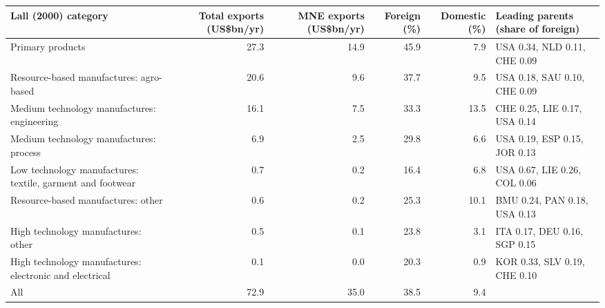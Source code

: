 \begin{tabular}{@{}l r r r r l@{}}
\toprule
Lall (2000) category & Total exports (US\$bn/yr) & MNE exports (US\$bn/yr) & Foreign (\%) & Domestic (\%) & Leading parents (share of foreign) \\
\midrule
Primary products & 27.3 & 14.9 & 45.9 & 7.9 & USA 0.34, NLD 0.11, CHE 0.09 \\
Resource-based manufactures: agro-based & 20.6 & 9.6 & 37.7 & 9.5 & USA 0.18, SAU 0.10, CHE 0.09 \\
Medium technology manufactures: engineering & 16.1 & 7.5 & 33.3 & 13.5 & CHE 0.25, LIE 0.17, USA 0.14 \\
Medium technology manufactures: process & 6.9 & 2.5 & 29.8 & 6.6 & USA 0.19, ESP 0.15, JOR 0.13 \\
Low technology manufactures: textile, garment and footwear & 0.7 & 0.2 & 16.4 & 6.8 & USA 0.67, LIE 0.26, COL 0.06 \\
Resource-based manufactures: other & 0.6 & 0.2 & 25.3 & 10.1 & BMU 0.24, PAN 0.18, USA 0.13 \\
High technology manufactures: other & 0.5 & 0.1 & 23.8 & 3.1 & ITA 0.17, DEU 0.16, SGP 0.15 \\
High technology manufactures: electronic and electrical & 0.1 & 0.0 & 20.3 & 0.9 & KOR 0.33, SLV 0.19, CHE 0.10 \\
\midrule
All & 72.9 & 35.0 & 38.5 & 9.4 & \\
\bottomrule
\end{tabular}
